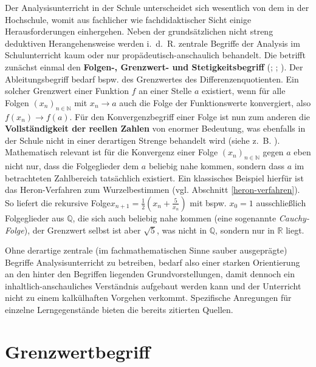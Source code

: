 \documentclass[
]{scrbook}
\theoremstyle{definition}
\theoremstyle{definition}
\theoremstyle{definition}
\theoremstyle{definition}
\theoremstyle{remark}
\begin{document}
Der Analysisunterricht in der Schule unterscheidet sich wesentlich von dem in der Hochschule, womit aus fachlicher wie fachdidaktischer Sicht einige Herausforderungen einhergehen. Neben der grundsätzlichen nicht streng deduktiven Herangehensweise werden i.~d.~R. zentrale Begriffe der Analysis im Schulunterricht kaum oder nur propädeutisch-anschaulich behandelt. Die betrifft zunächst einmal den \textbf{Folgen-, Grenzwert- und Stetigkeitsbegriff} (; ; ). Der Ableitungsbegriff bedarf bspw. des Grenzwertes des Differenzenquotienten. Ein solcher Grenzwert einer Funktion \(f\) an einer Stelle \(a\) existiert, wenn für alle Folgen \((x_n)_{n\in\mathbb{N}}\) mit \(x_n\rightarrow a\) auch die Folge der Funktionswerte konvergiert, also \(f(x_n)\rightarrow f(a)\). Für den Konvergenzbegriff einer Folge ist nun zum anderen die \textbf{Vollständigkeit der reellen Zahlen} von enormer Bedeutung, was ebenfalls in der Schule nicht in einer derartigen Strenge behandelt wird (siehe z.~B. ). Mathematisch relevant ist für die Konvergenz einer Folge \((x_n)_{n\in\mathbb{N}}\) gegen \(a\) eben nicht nur, dass die Folgeglieder dem \(a\) beliebig nahe kommen, sondern dass \(a\) im betrachteten Zahlbereich tatsächlich existiert. Ein klassisches Beispiel hierfür ist das Heron-Verfahren zum Wurzelbestimmen (vgl. Abschnitt \ref{heron-verfahren}). So liefert die rekursive Folge\(x_{n+1} = \frac{1}{2}\left(x_n + \frac{5}{x_n}\right)\) mit bspw. \(x_0 = 1\) ausschließlich Folgeglieder aus \(\mathbb{Q}\), die sich auch beliebig nahe kommen (eine sogenannte \emph{Cauchy-Folge}), der Grenzwert selbst ist aber \(\sqrt{5}\), was nicht in \(\mathbb{Q}\), sondern nur in \(\mathbb{R}\) liegt.

Ohne derartige zentrale (im fachmathematischen Sinne sauber ausgeprägte) Begriffe Analysisunterricht zu betreiben, bedarf also einer starken Orientierung an den hinter den Begriffen liegenden Grundvorstellungen, damit dennoch ein inhaltlich-anschauliches Verständnis aufgebaut werden kann und der Unterricht nicht zu einem kalkülhaften Vorgehen verkommt. Spezifische Anregungen für einzelne Lerngegenstände bieten die bereits zitierten Quellen.

\section{Grenzwertbegriff}\label{grenzwertbegriff}
\end{document}
